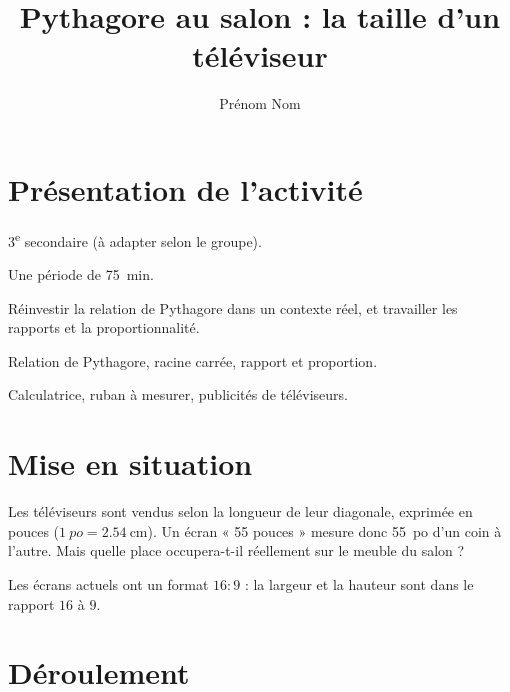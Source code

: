 \documentclass[11pt]{article}
\title{Pythagore au salon : la taille d'un téléviseur}
\author{Prénom Nom}
\date{}
\begin{document}
\maketitle
\thispagestyle{fancy}

\section{Présentation de l'activité}

\begin{description}[leftmargin=3.6cm, style=nextline, font=\normalfont]
  \item[Niveau visé] 3\textsuperscript{e} secondaire (à adapter selon
    le groupe).
  \item[Durée] Une période de \qty{75}{\minute}.
  \item[Intention] Réinvestir la relation de Pythagore dans un contexte
    réel, et travailler les rapports et la proportionnalité.
  \item[Préalables] Relation de Pythagore, racine carrée, rapport et
    proportion.
  \item[Matériel] Calculatrice, ruban à mesurer, publicités de
    téléviseurs.
\end{description}

\section{Mise en situation}

Les téléviseurs sont vendus selon la longueur de leur diagonale,
exprimée en pouces ($\qty{1}{po} = \qty{2,54}{\centi\metre}$).
Un écran « 55 pouces » mesure donc \qty{55}{po} d'un coin à
l'autre. Mais quelle place occupera-t-il réellement sur le meuble du
salon ?

Les écrans actuels ont un format $16:9$ : la largeur et la hauteur
sont dans le rapport $16$ à $9$.

\begin{center}
\end{center}

\section{Déroulement}
\end{document}
